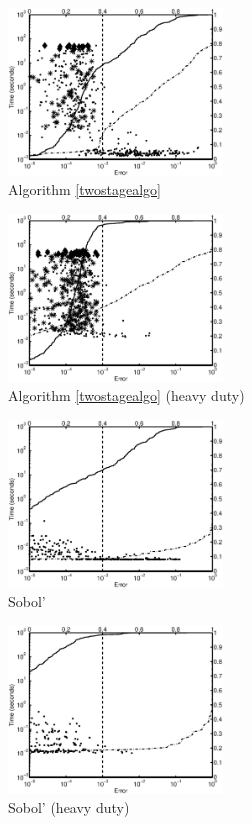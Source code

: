\documentclass[graybox]{svmult}
\begin{document}
\begin{figure}
\begin{minipage}{5.7cm} \centering \includegraphics[width=5.7cm]{gaussiand=1iidErrTime.eps} \\ Algorithm \ref{twostagealgo}  \end{minipage}
\begin{minipage}{5.7cm} \centering \includegraphics[width=5.7cm]{gaussiand=1iidheavyErrTime.eps} \\ Algorithm \ref{twostagealgo} (heavy duty)\end{minipage}
\begin{minipage}{5.7cm} \centering \includegraphics[width=5.7cm]{gaussiand=1SobolErrTime.eps} \\  Sobol'\end{minipage}
\begin{minipage}{5.7cm} \centering \includegraphics[width=5.7cm]{gaussiand=1SobolheavyErrTime.eps} \\ Sobol' (heavy duty) \end{minipage}

\end{figure}
\end{document}

